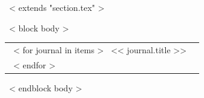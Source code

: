 ~< extends "section.tex" >~

~< block body >~
\begin{tabular}{p{1.5in}p{5in}}
  ~< for journal in items >~
    << journal.title >> \\
  ~< endfor >~
\end{tabular}
~< endblock body >~
